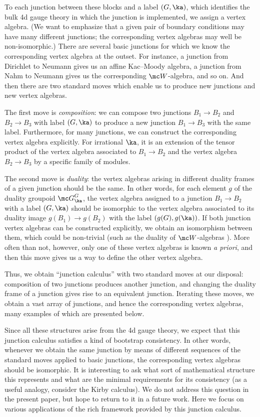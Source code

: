\documentclass[11pt,reqno]{amsart}
\theoremstyle{plain}
\numberwithin{equation}{section}
\theoremstyle{definition}
\begin{document}
To each junction between these blocks and a label $(G,\ka)$, which
identifies the bulk 4d gauge theory in which the junction is
implemented, we assign a vertex algebra. (We want to emphasize that a
given pair of boundary conditions may have many different junctions;
the corresponding vertex algebras may well be non-isomorphic.) There
are several basic junctions for which we know the corresponding vertex
algebra at the outset. For instance, a junction from Dirichlet to
Neumann gives us an affine Kac--Moody algebra, a junction from Nahm to
Neumann gives us the corresponding ${\mc W}$-algebra, and so on. And
then there are two standard moves which enable us to produce new
junctions and new vertex algebras.

The first move is {\em composition}: we can compose two junctions $B_1
\to B_2$ and $B_2 \to B_3$ with label $(G,\ka)$ to produce a new
junction $B_1 \to B_3$ with the same label. Furthermore, for many
junctions, we can construct the corresponding vertex algebra
explicitly. For irrational $\ka$, it is an extension of the tensor
product of the vertex algebra associated to $B_1 \to B_2$ and the
vertex algebra $B_2 \to B_3$ by a specific family of modules.

The second move is {\em duality}: the vertex algebras arising in
different duality frames of a given junction should be the same. In
other words, for each element $g$ of the duality groupoid ${\mc
  G}^G_\ka$, the vertex algebra assigned to a junction $B_1 \to B_2$
with a label $(G,\ka)$ should be isomorphic to the vertex algebra
associated to its duality image $g(B_1) \to g(B_2)$ with the label
$(g(G),g(\ka))$. If both junction vertex algebras can be constructed
explicitly, we obtain an isomorphism between them, which could be
non-trivial (such as the duality of ${\mc W}$-algebras
\cite{FF}). More often than not, however, only one of these vertex
algebras is known {\em a priori}, and then this move gives us a way to
define the other vertex algebra.

Thus, we obtain ``junction calculus'' with two standard moves at our
disposal: composition of two junctions produces another junction, and
changing the duality frame of a junction gives rise to an equivalent
junction. Iterating these moves, we obtain a vast array of junctions,
and hence the corresponding vertex algebras, many examples of which
are presented below.

Since all these structures arise from the 4d gauge theory, we expect
that this junction calculus satisfies a kind of bootstrap
consistency. In other words, whenever we obtain the same junction by
means of different sequences of the standard moves applied to
basic junctions, the corresponding vertex algebras should be
isomorphic. It is interesting to ask what sort of mathematical
structure this represents and what are the minimal requirements for
its consistency (as a useful analogy, consider the Kirby calculus). We
do not address this question in the present paper, but hope to return
to it in a future work. Here we focus on various applications of the
rich framework provided by this junction calculus.
\end{document}
